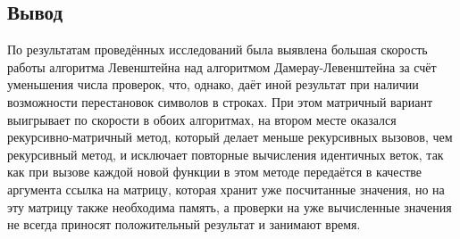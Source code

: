 \subsection*{Вывод}
По результатам проведённых исследований была выявлена большая скорость работы алгоритма Левенштейна над алгоритмом Дамерау-Левенштейна за счёт уменьшения числа проверок, что, однако, даёт иной результат при наличии возможности перестановок символов в строках. При этом матричный вариант выигрывает по скорости в обоих алгоритмах, на втором месте оказался рекурсивно-матричный метод, который делает меньше рекурсивных вызовов, чем рекурсивный метод, и исключает повторные вычисления идентичных веток, так как при вызове каждой новой функции в этом методе передаётся в качестве аргумента ссылка на матрицу, которая хранит уже посчитанные значения, но на эту матрицу также необходима память, а проверки на уже вычисленные значения не всегда приносят положительный результат и занимают время.
\newpage